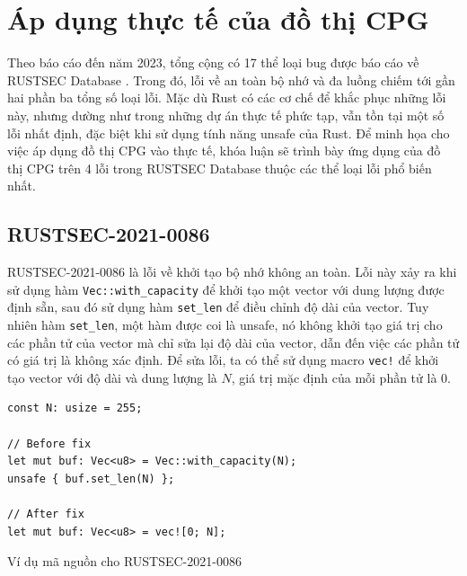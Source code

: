 \section{Áp dụng thực tế của đồ thị CPG}

Theo báo cáo đến năm 2023, tổng cộng có 17 thể loại bug được báo cáo về RUSTSEC Database \cite{zheng2023closer}.
Trong đó, lỗi về an toàn bộ nhớ và đa luồng chiếm tới gần hai phần ba tổng số loại lỗi.
Mặc dù Rust có các cơ chế để khắc phục những lỗi này, nhưng dường như trong những dự án thực tế phức tạp, vẫn tồn tại một số lỗi nhất định, đặc biệt khi sử dụng tính năng unsafe của Rust.
Để minh họa cho việc áp dụng đồ thị CPG vào thực tế, khóa luận sẽ trình bày ứng dụng của đồ thị CPG trên 4 lỗi trong RUSTSEC Database thuộc các thể loại lỗi phổ biến nhất.

\subsection{RUSTSEC-2021-0086}

RUSTSEC-2021-0086 là lỗi về khởi tạo bộ nhớ không an toàn.
Lỗi này xảy ra khi sử dụng hàm \texttt{Vec::with\_capacity} để khởi tạo một vector với dung lượng được định sẵn, sau đó sử dụng hàm \texttt{set\_len} để điều chỉnh độ dài của vector.
Tuy nhiên hàm \texttt{set\_len}, một hàm được coi là unsafe, nó không khởi tạo giá trị cho các phần tử của vector mà chỉ sửa lại độ dài của vector, dẫn đến việc các phần tử có giá trị là không xác định.
Để sửa lỗi, ta có thể sử dụng macro \texttt{vec!} để khởi tạo vector với độ dài và dung lượng là $N$, giá trị mặc định của mỗi phần tử là $0$.

\begin{listing}[H]
\begin{verbatim}
const N: usize = 255;

// Before fix
let mut buf: Vec<u8> = Vec::with_capacity(N);
unsafe { buf.set_len(N) };

// After fix
let mut buf: Vec<u8> = vec![0; N];
\end{verbatim}
\caption{Ví dụ mã nguồn cho RUSTSEC-2021-0086}
\label{code:c4_RUSTSEC-2021-0086}
\end{listing}

